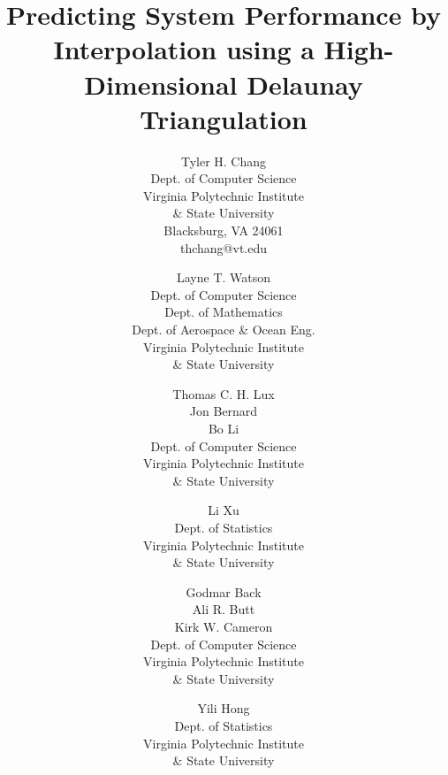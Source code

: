 \documentclass{scspaperproc}
\theoremstyle{scsthe}
\begin{document}

\def\SCSconferenceacro{SpringSim}
\def\SCSpublicationyear{2018}
\def\SCSconferencedates{April 15-18}
\def\SCSconferencevenue{Baltimore, MD, USA}
\def\SCSsymposiumacro{HPC} %

\title{Predicting System Performance by Interpolation using a High-Dimensional
Delaunay Triangulation}

\author{Tyler H. Chang \\ [12pt]
Dept. of Computer Science \\
Virginia Polytechnic Institute\\
\& State University \\
Blacksburg, VA 24061 \\
thchang@vt.edu \\
\and
Layne T. Watson \\[12pt]
Dept. of Computer Science\\
Dept. of Mathematics\\
Dept. of Aerospace \& Ocean Eng.\\ 
Virginia Polytechnic Institute\\
\& State University \\
\and
Thomas C. H. Lux\\
Jon Bernard\\
Bo Li\\[12pt]
Dept. of Computer Science\\ 
Virginia Polytechnic Institute\\
\& State University \\
\and
Li Xu\\[12pt]
Dept. of Statistics\\ 
Virginia Polytechnic Institute\\
\& State University \\
\and
Godmar Back\\
Ali R. Butt\\
Kirk W. Cameron\\[12pt]
Dept. of Computer Science\\ 
Virginia Polytechnic Institute\\
\& State University \\
\and
Yili Hong\\[12pt]
Dept. of Statistics\\ 
Virginia Polytechnic Institute\\
\& State University \\
}
\end{document}
